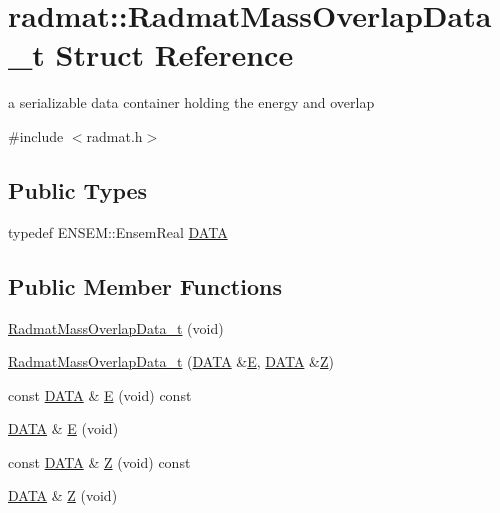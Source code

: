 \hypertarget{structradmat_1_1RadmatMassOverlapData__t}{}\section{radmat\+:\+:Radmat\+Mass\+Overlap\+Data\+\_\+t Struct Reference}
\label{structradmat_1_1RadmatMassOverlapData__t}


a serializable data container holding the energy and overlap  




{\ttfamily \#include $<$radmat.\+h$>$}

\subsection*{Public Types}
\begin{DoxyCompactItemize}
\item 
typedef E\+N\+S\+E\+M\+::\+Ensem\+Real \mbox{\hyperlink{structradmat_1_1RadmatMassOverlapData__t_ab3de1245b76e79f9867e3af00989e5b6}{D\+A\+TA}}
\end{DoxyCompactItemize}
\subsection*{Public Member Functions}
\begin{DoxyCompactItemize}
\item 
\mbox{\hyperlink{structradmat_1_1RadmatMassOverlapData__t_af0318fa5b4c4d312b12e898ef4de7510}{Radmat\+Mass\+Overlap\+Data\+\_\+t}} (void)
\item 
\mbox{\hyperlink{structradmat_1_1RadmatMassOverlapData__t_a8962ecc81be25ed4d5d564e008263ad8}{Radmat\+Mass\+Overlap\+Data\+\_\+t}} (\mbox{\hyperlink{structradmat_1_1RadmatMassOverlapData__t_ab3de1245b76e79f9867e3af00989e5b6}{D\+A\+TA}} \&\mbox{\hyperlink{structradmat_1_1RadmatMassOverlapData__t_a0789ab137fc29ffcc3a3917d25aec0fb}{E}}, \mbox{\hyperlink{structradmat_1_1RadmatMassOverlapData__t_ab3de1245b76e79f9867e3af00989e5b6}{D\+A\+TA}} \&\mbox{\hyperlink{structradmat_1_1RadmatMassOverlapData__t_a1453a8a3daa1adf8693514f0d5d9756b}{Z}})
\item 
const \mbox{\hyperlink{structradmat_1_1RadmatMassOverlapData__t_ab3de1245b76e79f9867e3af00989e5b6}{D\+A\+TA}} \& \mbox{\hyperlink{structradmat_1_1RadmatMassOverlapData__t_a0789ab137fc29ffcc3a3917d25aec0fb}{E}} (void) const
\item 
\mbox{\hyperlink{structradmat_1_1RadmatMassOverlapData__t_ab3de1245b76e79f9867e3af00989e5b6}{D\+A\+TA}} \& \mbox{\hyperlink{structradmat_1_1RadmatMassOverlapData__t_a3a27098e8d79fa26e30542418af6a63d}{E}} (void)
\item 
const \mbox{\hyperlink{structradmat_1_1RadmatMassOverlapData__t_ab3de1245b76e79f9867e3af00989e5b6}{D\+A\+TA}} \& \mbox{\hyperlink{structradmat_1_1RadmatMassOverlapData__t_a1453a8a3daa1adf8693514f0d5d9756b}{Z}} (void) const
\item 
\mbox{\hyperlink{structradmat_1_1RadmatMassOverlapData__t_ab3de1245b76e79f9867e3af00989e5b6}{D\+A\+TA}} \& \mbox{\hyperlink{structradmat_1_1RadmatMassOverlapData__t_a120afeed8c628a5af25b392856939057}{Z}} (void)
\end{DoxyCompactItemize}
